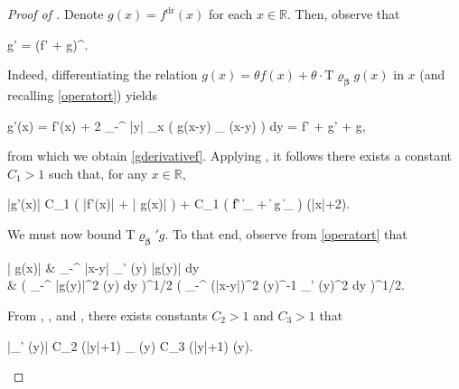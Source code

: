 \documentclass[10pt,a4paper]{amsart}
\DeclareMathOperator{\dr}{dr}
\begin{document}
	\begin{proof}[Proof of ]
		
		Denote $g(x) = f^{\dr} (x)$ for each $x \in \mathbb{R}$. Then, observe that 
		\begin{flalign}
			\label{gderivativef}
			g' = (f' +  g)^{\dr}.
		\end{flalign} 
		
		\noindent Indeed, differentiating the relation $g(x) = \theta f(x) + \theta \cdot \bm{\mathrm{T} \varrho_{\beta}} g (x)$ in $x$ (and recalling \eqref{operatort}) yields 
		\begin{flalign*}
			g'(x) = \theta f'(x) + 2 \theta \displaystyle\int_{-\infty}^{\infty} \log |y| \cdot \partial_x \big( g(x-y) \varrho_{\beta} (x-y) \big) dy = \theta f' + \theta {} g' + \theta \bm{\mathrm{T} \varrho_{\beta}'} g,
		\end{flalign*} 
		
		\noindent from which we obtain \eqref{gderivativef}. Applying , it follows there exists a constant $C_1>1$ such that, for any $x \in \mathbb{R}$, 
		\begin{flalign}
			\label{gderivativexestimate0} 
			|g'(x)| \le C_1 \cdot ( |f'(x)| + | g(x)| ) + C_1 \cdot ( \| f' \|_{} + \|  g \|_{} ) \cdot \log (|x|+2).
		\end{flalign}
		
		We must now bound $ g$. To that end, observe from \eqref{operatort} that 
		\begin{flalign}
			\label{tderivativeg} 
			\begin{aligned} 
			| g(x)| &   \displaystyle\int_{-\infty}^{\infty} \log |x-y| \cdot \varrho_{\beta}' (y) |g(y)| dy  \\
			&  \Bigg( \displaystyle\int_{-\infty}^{\infty} |g(y)|^2 \varrho (y) dy \Bigg)^{1/2} \Bigg( \displaystyle\int_{-\infty}^{\infty} (\log |x-y|)^2 \varrho (y)^{-1} \varrho_{\beta}' (y)^2 dy \Bigg)^{1/2}.
			\end{aligned}
		\end{flalign} 
		
		\noindent From , , and , there exists constants $C_2 > 1$ and $C_3 >1$ that 
		\begin{flalign*}
			|\varrho_{\beta}' (y)| \le C_2 (|y|+1) \cdot \varrho_{\beta} (y) \le C_3 (|y|+1) \cdot \varrho (y).
		\end{flalign*}
		

\end{proof}
\end{document}

